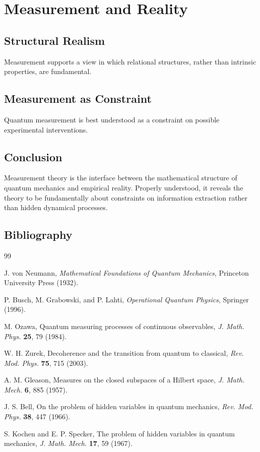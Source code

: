\documentclass[12pt]{book}
\theoremstyle{plain}
\theoremstyle{definition}
\theoremstyle{remark}
\begin{document}
\part{Measurement and Reality}

\chapter{Structural Realism}
Measurement supports a view in which relational structures, rather than intrinsic properties, are fundamental.

\chapter{Measurement as Constraint}
Quantum measurement is best understood as a constraint on possible experimental interventions.

\backmatter

\chapter*{Conclusion}
Measurement theory is the interface between the mathematical structure of quantum mechanics and empirical reality. Properly understood, it reveals the theory to be fundamentally about constraints on information extraction rather than hidden dynamical processes.

\chapter*{Bibliography}
\begin{thebibliography}{99}

J. von Neumann, \emph{Mathematical Foundations of Quantum Mechanics}, Princeton University Press (1932).

P. Busch, M. Grabowski, and P. Lahti, \emph{Operational Quantum Physics}, Springer (1996).

M. Ozawa, Quantum measuring processes of continuous observables, \emph{J. Math. Phys.} \textbf{25}, 79 (1984).

W. H. Zurek, Decoherence and the transition from quantum to classical, \emph{Rev. Mod. Phys.} \textbf{75}, 715 (2003).

A. M. Gleason, Measures on the closed subspaces of a Hilbert space, \emph{J. Math. Mech.} \textbf{6}, 885 (1957).

J. S. Bell, On the problem of hidden variables in quantum mechanics, \emph{Rev. Mod. Phys.} \textbf{38}, 447 (1966).

S. Kochen and E. P. Specker, The problem of hidden variables in quantum mechanics, \emph{J. Math. Mech.} \textbf{17}, 59 (1967).

\end{thebibliography}
\end{document}
